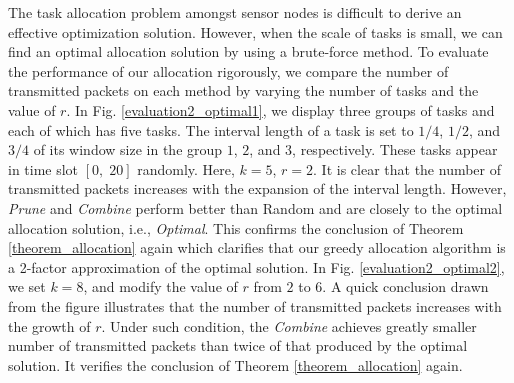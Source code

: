 \documentclass[prodmode,acmtosn]{acmsmall}
\begin{document}
The task allocation problem amongst sensor nodes is difficult to derive an effective optimization solution. However, when the scale of tasks is small, we can find an optimal allocation solution by using a brute-force method. To evaluate the performance of our allocation rigorously, we compare the number of transmitted packets on each method by varying the number of tasks and the value of $r$. In Fig. \ref{evaluation2_optimal1}, we display three groups of tasks and each of which has five tasks. The interval length of a task is set to $1/4$, $1/2$, and $3/4$ of its window size in the group $1$, $2$, and $3$, respectively. These tasks appear in time slot $[0,\; 20]$ randomly. Here, $k\mathrm{=}5$, $r\mathrm{=}2$. It is clear that the number of transmitted packets increases with the  expansion of the interval length. However, \emph{Prune} and \emph{Combine} perform better than Random and are closely to the optimal allocation solution, i.e., \emph{Optimal}. This confirms the conclusion of  Theorem \ref{theorem_allocation} again which clarifies that our greedy allocation algorithm is a 2-factor approximation  of the optimal solution. In Fig. \ref{evaluation2_optimal2}, we set $k\mathrm{=}8$, and modify the value of $r$ from $2$ to $6$. A quick conclusion drawn from the figure illustrates that the number of transmitted packets increases with the growth of $r$. Under such condition,  the \emph{Combine} achieves greatly smaller number of transmitted packets than twice of that produced by the optimal solution. It verifies the conclusion of Theorem \ref{theorem_allocation} again.
\end{document}
